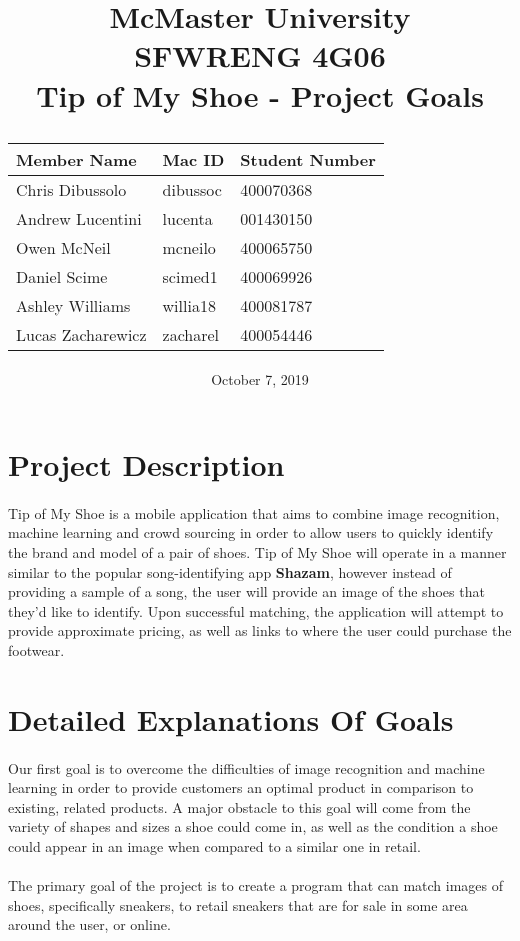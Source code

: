 \documentclass[12pt, titlepage]{article}
\title{
McMaster University\\
SFWRENG 4G06\\
\bigskip\bigskip\bigskip
{\bf Tip of My Shoe - Project Goals\\}
\bigskip\bigskip\bigskip\bigskip
\begin{table}[h!]
\begin{center}
\begin{tabular}{|p{5cm}|p{5cm}|p{5cm}|}
	\hline
	\bf Member Name & \bf Mac ID & \bf Student Number\\
	\hline
	\hline
	Chris Dibussolo & dibussoc & 400070368\\
	\hline
  Andrew Lucentini & lucenta & 001430150\\
  \hline
	Owen McNeil & mcneilo & 400065750 \\
	\hline
	Daniel Scime & scimed1 & 400069926\\
	\hline
  Ashley Williams & willia18 & 400081787\\
	\hline
  Lucas Zacharewicz & zacharel & 400054446\\
	\hline
\end{tabular}
\end{center}
\end{table}
\date{October 7, 2019}
}
\begin{document}
\maketitle

\newpage


\section{Project Description}

\paragraph{} Tip of My Shoe is a mobile application that aims to combine image recognition, machine learning and crowd sourcing in order to allow users to quickly identify the brand and model of a pair of shoes. Tip of My Shoe will operate in a manner similar to the popular song-identifying app \textbf{Shazam}, however instead of providing a sample of a song, the user will provide an image of the shoes that they'd like to identify. Upon successful matching, the application will attempt to provide approximate pricing, as well as links to where the user could purchase the footwear.

\section{Detailed Explanations Of Goals}

\paragraph{} Our first goal is to overcome the difficulties of image recognition and machine learning in order to provide customers an optimal product in comparison to existing, related products. A major obstacle to this goal will come from the variety of shapes and sizes a shoe could come in, as well as the condition a shoe could appear in an image when compared to a similar one in retail.

\paragraph{} The primary goal of the project is to create a program that can match images of shoes, specifically sneakers, to retail sneakers that are for sale in some area around the user, or online.
\end{document}
